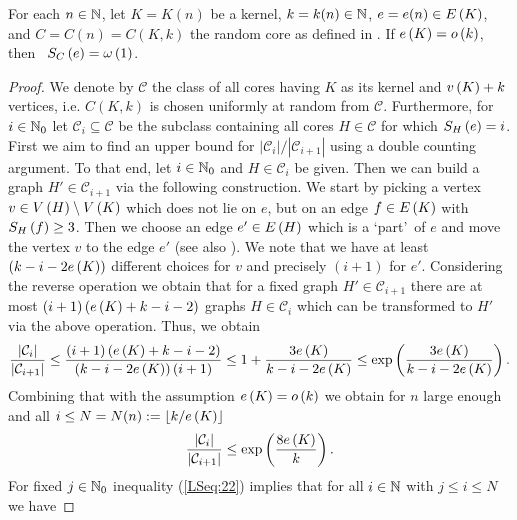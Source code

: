 \begin{lem}\label{LSlem:subdivision_number}
For each $n\in\mathbb{N}$, let $K=K(n)$ be a kernel, $k=k(n)\in\mathbb{N}$, $e=e(n)\in E\left(K\right)$, and $C=C(n)=C(K,k)$ the random core as defined in . If $e\left({K}\right)=o\left(k\right)$, then \whp\ $S_{C}\left(e\right)=\omega\left(1\right)$.
\end{lem}
\begin{proof}
We denote by $\mathcal{C}$ the class of all cores having $K$ as its kernel and $v\left({K}\right)+k$ vertices, i.e. $C(K,k)$ is chosen uniformly at random from $\mathcal{C}$. Furthermore, for $i\in\mathbb{N}_0$ let $\mathcal{C}_i\subseteq\mathcal{C}$ be the subclass containing all cores $H\in \mathcal{C}$ for which $S_{H}\left(e\right)=i$. First we aim to find an upper bound for $\left|\mathcal{C}_i\right|/\left|\mathcal{C}_{i+1}\right|$ using a double counting argument. To that end, let $i\in\mathbb{N}_0$ and $H\in\mathcal{C}_i$ be given. Then we can build a graph $H'\in\mathcal{C}_{i+1}$ via the following construction. We start by picking a vertex $v\in V\left(H\right)\setminus V\left(K\right)$ which does not lie on $e$, but on an edge $f\in E\left(K\right)$ with $S_{H}\left(f\right)\geq 3$. Then we choose an edge $e'\in E\left(H\right)$ which is a \lq part\rq\ of $e$ and move the vertex $v$ to the edge $e'$ (see also ). We note that we have at least $\left(k-i-2e\left({K}\right)\right)$ different choices for $v$ and precisely $(i+1)$ for $e'$. Considering the reverse operation we obtain that for a fixed graph $H'\in\mathcal{C}_{i+1}$ there are at most $(i+1)\left(e\left({K}\right)+k-i-2\right)$ graphs $H\in\mathcal{C}_i$ which can be transformed to $H'$ via the above operation. Thus, we obtain
\begin{align*}
\frac{\left|\mathcal{C}_i\right|}{\left|\mathcal{C}_{i+1}\right|}\leq \frac{(i+1)\left(e\left({K}\right)+k-i-2\right)}{\left(k-i-2e\left({K}\right)\right)(i+1)}\leq 1+\frac{3e\left({K}\right)}{k-i-2e\left({K}\right)}\leq\exp\left(\frac{3e\left({K}\right)}{k-i-2e\left({K}\right)}\right).
\end{align*}
Combining that with the assumption $e\left({K}\right)=o\left(k\right)$ we obtain for $n$ large enough and all $i\leq N=N(n):=\lfloor k/e\left({K}\right)\rfloor$
\begin{align}\label{LSeq:22}
\frac{\left|\mathcal{C}_i\right|}{\left|\mathcal{C}_{i+1}\right|}\leq\exp\left(\frac{8e\left({K}\right)}{k}\right).
\end{align}
For fixed $j\in\mathbb{N}_0$ inequality (\ref{LSeq:22}) implies that for all $i\in\mathbb{N}$ with $j\leq i\leq N$ we have

\end{proof}
